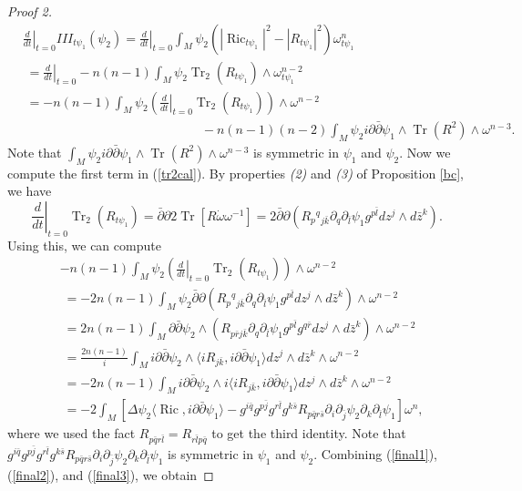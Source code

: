 \documentclass[12pt,reqno,a4paper]{amsart}
\numberwithin{equation}{section}
\def\bz{\bar z}
\def\bk{\bar k}
\def\bl{\bar l}
\def\br{\bar r}
\def\p{\partial}
\def\bp{\bar\partial}
\DeclareMathOperator{\Tr}{Tr}
\DeclareMathOperator{\ric}{Ric}
\theoremstyle{remark}
\theoremstyle{dotless}
\begin{document}
\begin{proof}[Proof 2]
\begin{align}\label{tr2cal}
&\left.\frac{d}{dt}\right|_{t=0}III_{t\psi_1}(\psi_2)= \left.\frac{d}{dt}\right|_{t=0}\int_M \psi_2\left(|\ric_{t\psi_1}|^2-|R_{t\psi_1}|^2\right)\omega_{t\psi_1}^n \nonumber\\
&\;=\left.\frac{d}{dt}\right|_{t=0} -n(n-1)\int_M \psi_2\Tr_2(R_{t\psi_1})\wedge\omega_{t\psi_1}^{n-2} \nonumber\\
&\;= -n(n-1)\int_M \psi_2 \left( \left.\frac{d}{dt}\right|_{t=0} \Tr_2(R_{t\psi_1}) \right) \wedge\omega^{n-2} \nonumber\\
&\qquad\qquad\qquad\qquad\qquad\qquad\qquad-n(n-1)(n-2)\int_M \psi_2 i\p\bp\psi_1\wedge\Tr(R^2)\wedge\omega^{n-3}. 
\end{align}
Note that $\int_M \psi_2 i\p\bp\psi_1\wedge\Tr(R^2)\wedge\omega^{n-3}$ is symmetric in $\psi_1$ and $\psi_2$. Now we compute the first term in (\ref{tr2cal}). By properties \textit{(2)} and \textit{(3)} of Proposition \ref{bc}, we have
\begin{equation*}
\left.\frac{d}{dt}\right|_{t=0} \Tr_2(R_{t\psi_1})=\bp\p 2\Tr[R\dot{\omega}\omega^{-1}]=2\bp\p \left(R_{p}{}^{q}{}_{j\bk}\p_{q}\p_{\bl}\psi_1 g^{p\bl} dz^j\wedge d\bz^k \right).
\end{equation*} 
Using this, we can compute
\begin{align}\label{final3}
& -n(n-1)\int_M \psi_2 \left( \left.\frac{d}{dt}\right|_{t=0} \Tr_2(R_{t\psi_1}) \right)\wedge \omega^{n-2}  \nonumber\\
&\;= -2n(n-1)\int_M \psi_2\bp\p \left(R_{p}{}^{q}{}_{j\bk}\p_{q}\p_{\bl}\psi_1 g^{p\bl} dz^j\wedge d\bz^k \right) \wedge\omega^{n-2}  \nonumber\\
&\;=2n(n-1)\int_M \p\bp\psi_2\wedge \left(R_{p\br j\bk}\p_{q}\p_{\bl}\psi_1 g^{p\bl}g^{q\br}dz^j\wedge d\bz^k \right)\wedge \omega^{n-2} \nonumber\\
&\;= \frac{2n(n-1)}{i}\int_M i\p\bp\psi_2 \wedge\langle iR_{j\bk},i\p\bp\psi_1 \rangle dz^j\wedge d\bz^k \wedge \omega^{n-2} \nonumber\\
&\;=-2n(n-1)\int_M i\p\bp\psi_2 \wedge i\langle iR_{j\bk},i\p\bp\psi_1 \rangle dz^j\wedge d\bz^k \wedge \omega^{n-2}  \nonumber\\
&\;=-2\int_M \left[ \Delta\psi_2 \langle \ric, i\p\bp\psi_1 \rangle - g^{i\bar{q}}g^{p\bar{j}}g^{r\bar{l}}g^{k\bar{s}} R_{p\bar{q}r\bar{s}} \p_i\p_{\bar{j}}\psi_2 \p_k\p_{\bar{l}}\psi_1 \right]\omega^n, 
\end{align}
where we used the fact $R_{p\bar{q} r\bl}=R_{r\bl p\bar{q}}$ to get the third identity. Note that $g^{i\bar{q}}g^{p\bar{j}}g^{r\bar{l}}g^{k\bar{s}} R_{p\bar{q}r\bar{s}} \p_i\p_{\bar{j}}\psi_2 \p_k\p_{\bar{l}}\psi_1$ is symmetric in $\psi_1$ and $\psi_2$. Combining (\ref{final1}), (\ref{final2}), and (\ref{final3}), we obtain


\end{proof}
\end{document}
